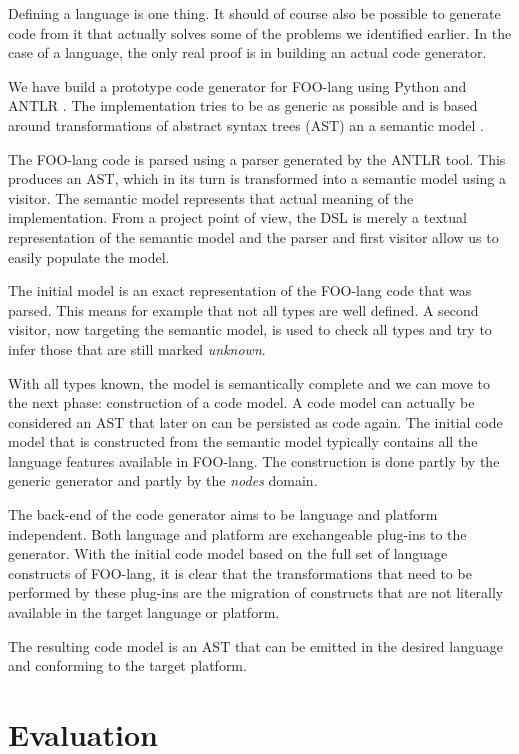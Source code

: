 \documentclass[conference]{IEEEtran}
\begin{document}
Defining a language is one thing. It should of course also be possible to
generate code from it that actually solves some of the problems we identified
earlier. In the case of a language, the only real proof is in building an
actual code generator.

We have build a prototype code generator for FOO-lang using Python and ANTLR
\cite{antlr3}. The implementation tries to be as generic as possible and is
based around transformations of abstract syntax trees (AST) an a semantic model
\cite{fowler2010domain}.

The FOO-lang code is parsed using a parser generated by the ANTLR tool. This
produces an AST, which in its turn is transformed into a semantic model using a
visitor. The semantic model represents that actual meaning of the
implementation. From a project point of view, the DSL is merely a textual
representation of the semantic model and the parser and first visitor allow us
to easily populate the model.

The initial model is an exact representation of the FOO-lang code that was
parsed. This means for example that not all types are well defined. A second
visitor, now targeting the semantic model, is used to check all types and try
to infer those that are still marked \emph{unknown}.

With all types known, the model is semantically complete and we can move to the
next phase: construction of a code model. A code model can actually be
considered an AST that later on can be persisted as code again. The initial
code model that is constructed from the semantic model typically contains all
the language features available in FOO-lang. The construction is done partly by
the generic generator and partly by the \emph{nodes} domain.

The back-end of the code generator aims to be language and platform
independent. Both language and platform are exchangeable plug-ins to the
generator. With the initial code model based on the full set of language
constructs of FOO-lang, it is clear that the transformations that need to be
performed by these plug-ins are the migration of constructs that are not
literally available in the target language or platform.

The resulting code model is an AST that can be emitted in the desired language
and conforming to the target platform.

\section{Evaluation}
\label{section:evaluation}
\end{document}
